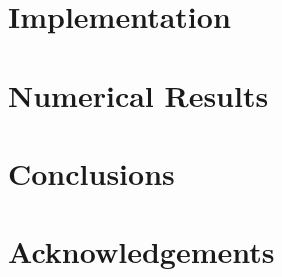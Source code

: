 \documentclass[12pt, oneside]{book}
\begin{document}
    


    \newpage
    \chapter{Implementation} \label{chapter:implementation}

    


    \newpage
    \chapter{Numerical Results} \label{chapter:results}

    


    \newpage
    \chapter*{Conclusions} \label{chapter:conclusions}

    


    \chapter*{Acknowledgements}

    


    \newpage

    \printbibliography


    \newpage
    
    
\end{document}
